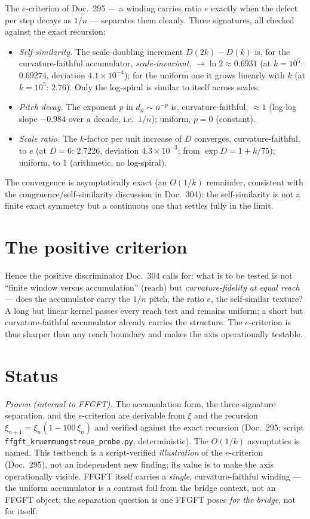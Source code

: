 The $e$-criterion of Doc.~295 --- a winding carries ratio $e$ exactly when the defect per step
decays as $1/n$ --- separates them cleanly. Three signatures, all checked against the exact
recursion:
\begin{itemize}
\item \emph{Self-similarity.} The scale-doubling increment $D(2k)-D(k)$ is, for the
curvature-faithful accumulator, \emph{scale-invariant}, $\to\ln 2\approx0.6931$ (at $k=10^5$:
$0.69274$, deviation $4.1\times10^{-4}$); for the uniform one it grows linearly with $k$ (at
$k=10^5$: $2.76$). Only the log-spiral is similar to itself across scales.
\item \emph{Pitch decay.} The exponent $p$ in $d_n\sim n^{-p}$ is, curvature-faithful,
$\approx1$ (log-log slope $-0.984$ over a decade, i.e.\ $1/n$); uniform, $p=0$ (constant).
\item \emph{Scale ratio.} The $k$-factor per unit increase of $D$ converges,
curvature-faithful, to $e$ (at $D=6$: $2.7226$, deviation $4.3\times10^{-3}$; from
$\exp D=1+k/75$); uniform, to $1$ (arithmetic, no log-spiral).
\end{itemize}
The convergence is asymptotically exact (an $O(1/k)$ remainder, consistent with the
congruence/self-similarity discussion in Doc.~304): the self-similarity is not a finite exact
symmetry but a continuous one that settles fully in the limit.

\section{The positive criterion}

Hence the positive discriminator Doc.~304 calls for: what is to be tested is not \enquote{finite
window versus accumulation} (reach) but \emph{curvature-fidelity at equal reach} --- does the
accumulator carry the $1/n$ pitch, the ratio $e$, the self-similar texture? A long but linear
kernel passes every reach test and remains uniform; a short but curvature-faithful accumulator
already carries the structure. The $e$-criterion is thus sharper than any reach boundary and
makes the axis operationally testable.

\section{Status}

\emph{Proven (internal to FFGFT).} The accumulation form, the three-signature separation, and
the $e$-criterion are derivable from $\xi$ and the recursion $\xi_{n+1}=\xi_n(1-100\,\xi_n)$ and
verified against the exact recursion (Doc.~295; script \texttt{ffgft\_kruemmungstreue\_probe.py},
deterministic). The $O(1/k)$ asymptotics is named. This testbench is a script-verified \emph{illustration} of the $e$-criterion (Doc.~295), not an independent new finding; its value is to make the axis operationally visible. FFGFT itself carries a \emph{single}, curvature-faithful winding --- the uniform accumulator is a contrast foil from the bridge context, not an FFGFT object; the separation question is one FFGFT poses \emph{for the bridge}, not for itself.


